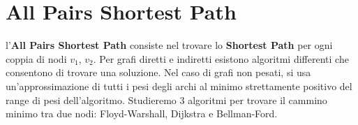\chapter{All Pairs Shortest Path}

l'\textbf{All Pairs Shortest Path} consiste nel trovare lo \textbf{Shortest Path} per ogni coppia di nodi $v_1$, $v_2$.
Per grafi diretti e indiretti esistono algoritmi differenti che consentono di trovare una soluzione.
Nel caso di grafi non pesati, si usa un'approssimazione di tutti i pesi degli archi al minimo strettamente positivo del range di pesi dell'algoritmo.
Studieremo 3 algoritmi per trovare il cammino minimo tra due nodi: Floyd-Warshall, Dijkstra e Bellman-Ford.
